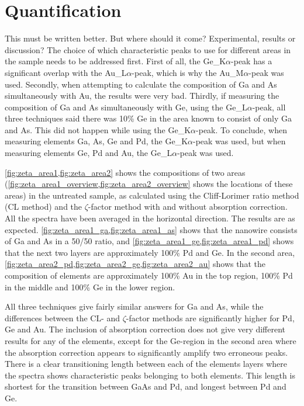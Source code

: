 \section{Quantification}

This must be written better. But where should it come? Experimental, results or discussion?
The choice of which characteristic peaks to use for different areas in the sample needs to be addressed first. First of all, the Ge\_{K$\alpha$}-peak has a significant overlap with the Au\_{L$\alpha$}-peak, which is why the Au\_{M$\alpha$}-peak was used. Secondly, when attempting to calculate the composition of Ga and As simultaneously with Au, the results were very bad. Thirdly, if measuring the composition of Ga and As simultaneously with Ge, using the Ge\_{L$\alpha$}-peak, all three techniques said there was 10\% Ge in the area known to consist of only Ga and As. This did not happen while using the Ge\_{K$\alpha$}-peak. To conclude, when measuring elements Ga, As, Ge and Pd, the Ge\_{K$\alpha$}-peak was used, but when measuring elements Ge, Pd and Au, the Ge\_{L$\alpha$}-peak was used.

\cref{fig:zeta_area1,fig:zeta_area2} shows the compositions of two areas (\cref{fig:zeta_area1_overview,fig:zeta_area2_overview} shows the locations of these areas) in the untreated sample, as calculated using the Cliff-Lorimer ratio method (CL method) and the $\zeta$-factor method with and without absorption correction. All the spectra have been averaged in the horizontal direction. The results are as expected. \cref{fig:zeta_area1_ga,fig:zeta_area1_as} shows that the nanowire consists of Ga and As in a 50/50 ratio, and \cref{fig:zeta_area1_ge,fig:zeta_area1_pd} shows that the next two layers are approximately 100\% Pd and Ge. In the second area, \cref{fig:zeta_area2_pd,fig:zeta_area2_ge,fig:zeta_area2_au} shows that the composition of elements are approximately 100\% Au in the top region, 100\% Pd in the middle and 100\% Ge in the lower region.

All three techniques give fairly similar answers for Ga and As, while the differences between the CL- and $\zeta$-factor methods are significantly higher for Pd, Ge and Au. The inclusion of absorption correction does not give very different results for any of the elements, except for the Ge-region in the second area where the absorption correction appears to significantly amplify two erroneous peaks.
There is a clear transitioning length between each of the elements layers where the spectra shows characteristic peaks belonging to both elements. This length is shortest for the transition between GaAs and Pd, and longest between Pd and Ge.

